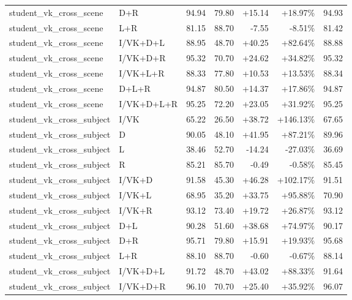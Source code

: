 \documentclass[UTF8,10pt,a4paper]{ctexart}
\newcommand{\better}[1]{\textcolor{ImpBlue}{#1}}
\newcommand{\worse}[1]{\textcolor{DropRed}{#1}}
\begin{document}
{\begin{longtable}{llrrrrr}
student\_vk\_cross\_scene & D+R & 94.94 & 79.80 & \better{+15.14} & \better{+18.97\%} & 94.93\\
student\_vk\_cross\_scene & L+R & 81.15 & 88.70 & \worse{-7.55} & \worse{-8.51\%} & 81.42\\
student\_vk\_cross\_scene & I/VK+D+L & 88.95 & 48.70 & \better{+40.25} & \better{+82.64\%} & 88.88\\
student\_vk\_cross\_scene & I/VK+D+R & 95.32 & 70.70 & \better{+24.62} & \better{+34.82\%} & 95.32\\
student\_vk\_cross\_scene & I/VK+L+R & 88.33 & 77.80 & \better{+10.53} & \better{+13.53\%} & 88.34\\
student\_vk\_cross\_scene & D+L+R & 94.87 & 80.50 & \better{+14.37} & \better{+17.86\%} & 94.87\\
student\_vk\_cross\_scene & I/VK+D+L+R & 95.25 & 72.20 & \better{+23.05} & \better{+31.92\%} & 95.25\\
student\_vk\_cross\_subject & I/VK & 65.22 & 26.50 & \better{+38.72} & \better{+146.13\%} & 67.65\\
student\_vk\_cross\_subject & D & 90.05 & 48.10 & \better{+41.95} & \better{+87.21\%} & 89.96\\
student\_vk\_cross\_subject & L & 38.46 & 52.70 & \worse{-14.24} & \worse{-27.03\%} & 36.69\\
student\_vk\_cross\_subject & R & 85.21 & 85.70 & \worse{-0.49} & \worse{-0.58\%} & 85.45\\
student\_vk\_cross\_subject & I/VK+D & 91.58 & 45.30 & \better{+46.28} & \better{+102.17\%} & 91.51\\
student\_vk\_cross\_subject & I/VK+L & 68.95 & 35.20 & \better{+33.75} & \better{+95.88\%} & 70.90\\
student\_vk\_cross\_subject & I/VK+R & 93.12 & 73.40 & \better{+19.72} & \better{+26.87\%} & 93.12\\
student\_vk\_cross\_subject & D+L & 90.28 & 51.60 & \better{+38.68} & \better{+74.97\%} & 90.17\\
student\_vk\_cross\_subject & D+R & 95.71 & 79.80 & \better{+15.91} & \better{+19.93\%} & 95.68\\
student\_vk\_cross\_subject & L+R & 88.10 & 88.70 & \worse{-0.60} & \worse{-0.67\%} & 88.14\\
student\_vk\_cross\_subject & I/VK+D+L & 91.72 & 48.70 & \better{+43.02} & \better{+88.33\%} & 91.64\\
student\_vk\_cross\_subject & I/VK+D+R & 96.10 & 70.70 & \better{+25.40} & \better{+35.92\%} & 96.07\\

\end{longtable}}
\end{document}
